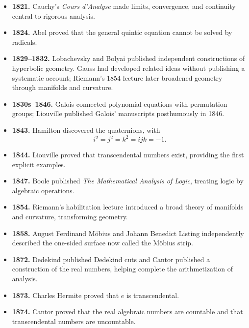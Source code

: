 \begin{itemize}
              \textit{Disquisitiones Arithmeticae}, reorganizing number theory;
              in the same year his least-squares calculations helped recover
              the orbit of Ceres.
        \item \textbf{1821.} Cauchy's \textit{Cours d'Analyse} made limits,
              convergence, and continuity central to rigorous analysis.
        \item \textbf{1824.} Abel proved that the general quintic equation
              cannot be solved by radicals.
        \item \textbf{1829--1832.} Lobachevsky and Bolyai published independent
              constructions of hyperbolic geometry. Gauss had developed related
              ideas without publishing a systematic account; Riemann's 1854
              lecture later broadened geometry through manifolds and curvature.
        \item \textbf{1830s--1846.} Galois connected polynomial equations with
              permutation groups; Liouville published Galois' manuscripts
              posthumously in 1846.
        \item \textbf{1843.} Hamilton discovered the quaternions, with
              \[
                  i^2=j^2=k^2=ijk=-1.
              \]
        \item \textbf{1844.} Liouville proved that transcendental numbers exist,
              providing the first explicit examples.
        \item \textbf{1847.} Boole published
              \textit{The Mathematical Analysis of Logic}, treating logic by
              algebraic operations.
        \item \textbf{1854.} Riemann's habilitation lecture introduced a broad
              theory of manifolds and curvature, transforming geometry.
        \item \textbf{1858.} August Ferdinand Möbius and Johann Benedict
              Listing independently described the one-sided surface now called
              the Möbius strip.
        \item \textbf{1872.} Dedekind published Dedekind cuts and Cantor
              published a construction of the real numbers, helping complete
              the arithmetization of analysis.
        \item \textbf{1873.} Charles Hermite proved that $e$ is transcendental.
        \item \textbf{1874.} Cantor proved that the real algebraic numbers are
              countable and that transcendental numbers are uncountable.

\end{itemize}
